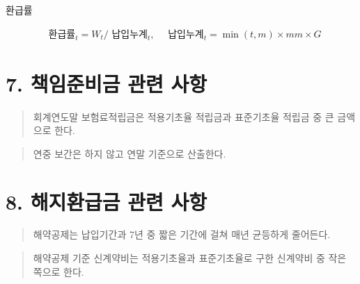 \documentclass[10pt,a4paper]{article}
\begin{document}
환급률

\begin{align*}
& \text{환급률}_t = W_t / \text{ 납입누계}_t, \quad \text{ 납입누계}_t = \min(t, m) \times mm \times G
\end{align*}

\section*{7. 책임준비금 관련 사항}

\begin{quote}\small
회계연도말 보험료적립금은 적용기초율 적립금과 표준기초율 적립금 중 큰 금액으로 한다.
\end{quote}

\begin{quote}\small
연중 보간은 하지 않고 연말 기준으로 산출한다.
\end{quote}

\section*{8. 해지환급금 관련 사항}

\begin{quote}\small
해약공제는 납입기간과 7년 중 짧은 기간에 걸쳐 매년 균등하게 줄어든다.
\end{quote}

\begin{quote}\small
해약공제 기준 신계약비는 적용기초율과 표준기초율로 구한 신계약비 중 작은 쪽으로 한다.
\end{quote}
\end{document}
